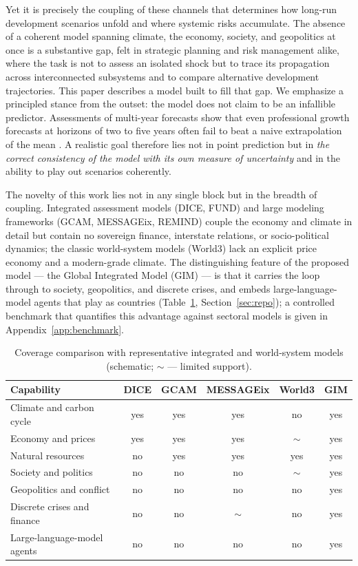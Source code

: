 \documentclass[11pt,a4paper]{article}
\begin{document}
Yet it is precisely the coupling of these channels that determines how long-run development
scenarios unfold and where systemic risks accumulate. The absence of a coherent model spanning
climate, the economy, society, and geopolitics at once is a substantive gap, felt in strategic
planning and risk management alike, where the task is not to assess an isolated shock but to trace
its propagation across interconnected subsystems and to compare alternative development
trajectories. This paper describes a model built to fill that gap. We emphasize a principled stance
from the outset: the model does not claim to be an infallible predictor. Assessments of multi-year
forecasts show that even professional growth forecasts at horizons of two to five years often fail
to beat a naive extrapolation of the mean \citep{celasun2021}. A realistic goal therefore lies not
in point prediction but in \emph{the correct consistency of the model with its own measure of
uncertainty} and in the ability to play out scenarios coherently.

The novelty of this work lies not in any single block but in the breadth of coupling. Integrated
assessment models (DICE, FUND) and large modeling frameworks (GCAM, MESSAGEix, REMIND) couple the
economy and climate in detail but contain no sovereign finance, interstate relations, or
socio-political dynamics; the classic world-system models (World3) lack an explicit price economy
and a modern-grade climate. The distinguishing feature of the proposed model --- the Global
Integrated Model (GIM) --- is that it carries the loop through to society, geopolitics, and discrete
crises, and embeds large-language-model agents that play as countries
(Table~\ref{tab:compare}, Section~\ref{sec:repo}); a controlled benchmark that quantifies this
advantage against sectoral models is given in Appendix~\ref{app:benchmark}.

\begin{table}[t]
\centering
\caption{Coverage comparison with representative integrated and world-system models (schematic;
$\sim$ --- limited support).}
\label{tab:compare}
\small
\begin{tabular}{@{}lccccc@{}}
\toprule
Capability & DICE & GCAM & MESSAGEix & World3 & GIM \\
\midrule
Climate and carbon cycle & yes & yes & yes & no & yes \\
Economy and prices & yes & yes & yes & $\sim$ & yes \\
Natural resources & no & yes & yes & yes & yes \\
Society and politics & no & no & no & $\sim$ & yes \\
Geopolitics and conflict & no & no & no & no & yes \\
Discrete crises and finance & no & no & $\sim$ & no & yes \\
Large-language-model agents & no & no & no & no & yes \\
\bottomrule
\end{tabular}
\end{table}
\end{document}
